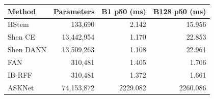 \begin{tabular}{lrrr}
\toprule Method & Parameters & B1 p50 (ms) & B128 p50 (ms)\\ \midrule
HStem & 133,690 & 2.142 & 15.956 \\
Shen CE & 13,442,954 & 1.170 & 22.853 \\
Shen DANN & 13,509,263 & 1.108 & 22.961 \\
FAN & 310,481 & 1.405 & 1.706 \\
IB-RFF & 310,481 & 1.372 & 1.661 \\
ASKNet & 74,153,872 & 2229.082 & 2260.086 \\
\bottomrule\end{tabular}
